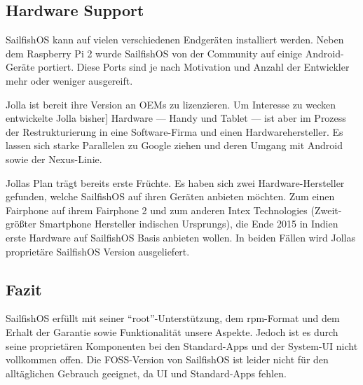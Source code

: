 \subsection{Hardware Support}
\mbox{SailfishOS} kann auf vielen verschiedenen Endgeräten installiert werden. Neben dem Raspberry Pi 2\thinspace\cite{online:sailfish-rpi2} wurde \mbox{SailfishOS} von der Community\thinspace\cite{online:sailfish-android-port} auf einige Android-Geräte portiert. Diese Ports sind je nach Motivation und Anzahl der Entwickler mehr oder weniger ausgereift\thinspace\cite{online:sailfish-porters}.

Jolla ist bereit ihre Version an OEMs zu lizenzieren. Um Interesse zu wecken entwickelte Jolla bisher] Hardware --- Handy\thinspace\cite{online:jolla-smartphone} und Tablet\thinspace\cite{online:jolla-tablet} --- ist aber im Prozess der Restrukturierung in eine Software-Firma und einen Hardwarehersteller\thinspace\cite{online:jolla-googlelike}. Es lassen sich starke Parallelen zu Google ziehen und deren Umgang mit Android sowie der Nexus-Linie.

Jollas Plan trägt bereits erste Früchte. Es haben sich zwei Hardware-Hersteller gefunden, welche \mbox{SailfishOS} auf ihren Geräten anbieten möchten. Zum einen Fairphone auf ihrem Fairphone 2\thinspace\cite{online:jolla-fairphone2} und zum anderen Intex Technologies (Zweit-größter Smartphone Hersteller indischen Ursprungs), die Ende 2015 in Indien erste Hardware auf \mbox{SailfishOS} Basis anbieten wollen\thinspace\cite{online:jolla-intex-pdf}. In beiden Fällen wird Jollas proprietäre \mbox{SailfishOS} Version ausgeliefert.
\newline

\subsection{Fazit}
\mbox{SailfishOS} erfüllt mit seiner \mbox{``root''-Unterstützung}, dem \mbox{rpm-Format} und dem Erhalt der Garantie sowie Funktionalität unsere Aspekte. Jedoch ist es durch seine proprietären Komponenten bei den \mbox{Standard-Apps} und der \mbox{System-UI} nicht vollkommen offen. Die \mbox{FOSS-Version} von \mbox{SailfishOS} ist leider nicht für den alltäglichen Gebrauch geeignet, da UI und \mbox{Standard-Apps} fehlen.